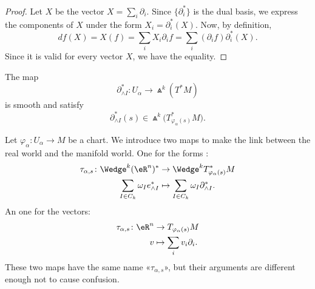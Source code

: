\begin{proof}
	Let \( X\) be the vector \( X=\sum_i\partial_i\). Since \( \{ \partial^*_i \}\) is the dual basis, we express the components of \( X\) under the form \( X_i=\partial_i^*(X)\). Now, by definition,
	\begin{equation}
		df(X)=X(f)=\sum_iX_i\partial_if=\sum_i(\partial_if)\partial_i^*(X).
	\end{equation}
	Since it is valid for every vector \( X\), we have the equality.
\end{proof}

\begin{lemma}		\label{LEMooIAASooDnnhRA}
	The map
	\begin{equation}
		\partial^*_{\wedge I}\colon U_{\alpha} \to \Wedge^k(T^*M)
	\end{equation}
	is smooth and satisfy
	\begin{equation}
		\partial_{\wedge I}^*(s)\in\Wedge^k\big( T^*_{\varphi_{\alpha}(s)}M \big).
	\end{equation}
\end{lemma}

\begin{normaltext}		\label{NORMooDQEZooHaJPoa}
	Let \(\varphi_{\alpha} \colon U_{\alpha}\to M  \) be a chart. We introduce two maps to make the link between the real world and the manifold world. One for the forms :
	\begin{equation}
		\begin{aligned}
			\tau_{\alpha,s}\colon \Wedge^k(\eR^n)^* & \to \Wedge^kT^*_{\varphi_{\alpha}(s)}M                \\
			\sum_{I\in C_k}\omega_Ie^*_{\wedge I}   & \mapsto \sum_{I\in C_k}\omega_I\partial^*_{\wedge I}.
		\end{aligned}
	\end{equation}
	An one for the vectors:
	\begin{equation}
		\begin{aligned}
			\tau_{\alpha,s}\colon \eR^n & \to T_{\varphi_{\alpha}(s)}M \\
			v                           & \mapsto \sum_iv_i\partial_i.
		\end{aligned}
	\end{equation}
	These two maps have the same name «\( \tau_{\alpha,s}\)», but their arguments are different enough not to cause confusion.
\end{normaltext}



